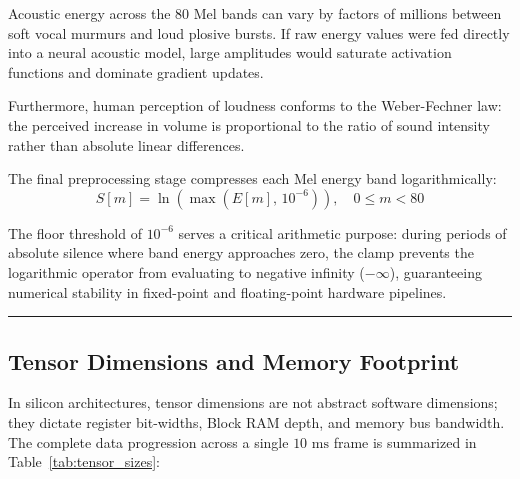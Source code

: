 \documentclass[11pt,a4paper]{article}
\begin{document}
Acoustic energy across the $80$ Mel bands can vary by factors of millions between soft vocal murmurs and loud plosive bursts. If raw energy values were fed directly into a neural acoustic model, large amplitudes would saturate activation functions and dominate gradient updates.

Furthermore, human perception of loudness conforms to the Weber-Fechner law: the perceived increase in volume is proportional to the ratio of sound intensity rather than absolute linear differences.

The final preprocessing stage compresses each Mel energy band logarithmically:
$$S[m] = \ln\left(\max\left(E[m], \, 10^{-6}\right)\right), \quad 0 \le m < 80$$

The floor threshold of $10^{-6}$ serves a critical arithmetic purpose: during periods of absolute silence where band energy approaches zero, the clamp prevents the logarithmic operator from evaluating to negative infinity ($-\infty$), guaranteeing numerical stability in fixed-point and floating-point hardware pipelines.

\smallskip
\hrule
\smallskip

\subsection*{Tensor Dimensions and Memory Footprint}

In silicon architectures, tensor dimensions are not abstract software dimensions; they dictate register bit-widths, Block RAM depth, and memory bus bandwidth. The complete data progression across a single $10\text{ ms}$ frame is summarized in Table~\ref{tab:tensor_sizes}:
\end{document}

